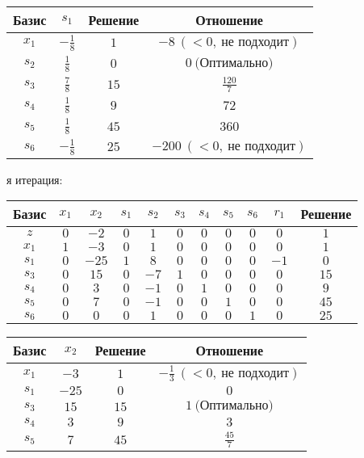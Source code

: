 \documentclass{article}%
\begin{document}
\begin{flushleft}
\begin{tabular}{|cccc|}
\hline%
Базис&$s_{1}$&Решение&Отношение\\%
\hline%
$x_{1}$&$-\frac{1}{8}$&$1$&$-8\: (< 0, \: \text{не подходит})$\\%
$s_{2}$&$\frac{1}{8}$&$0$&$0\: \text{(Оптимально)}$\\%
$s_{3}$&$\frac{7}{8}$&$15$&$\frac{120}{7}$\\%
$s_{4}$&$\frac{1}{8}$&$9$&$72$\\%
$s_{5}$&$\frac{1}{8}$&$45$&$360$\\%
$s_{6}$&$-\frac{1}{8}$&$25$&$-200\: (< 0, \: \text{не подходит})$\\%
\hline%
\end{tabular}%
\newline%
\newline%
я итерация: %
\newline%
\newline%
\renewcommand{\arraystretch}{1.3}%
\begin{tabular}{|c|ccccccccc|c|}%
\hline%
Базис&$x_{1}$&$x_{2}$&$s_{1}$&$s_{2}$&$s_{3}$&$s_{4}$&$s_{5}$&$s_{6}$&$r_{1}$&Решение\\%
\hline%
$z$&$0$&$-2$&$0$&$1$&$0$&$0$&$0$&$0$&$0$&$1$\\%
\hline%
$x_{1}$&$1$&$-3$&$0$&$1$&$0$&$0$&$0$&$0$&$0$&$1$\\%
$s_{1}$&$0$&$-25$&$1$&$8$&$0$&$0$&$0$&$0$&$-1$&$0$\\%
$s_{3}$&$0$&$15$&$0$&$-7$&$1$&$0$&$0$&$0$&$0$&$15$\\%
$s_{4}$&$0$&$3$&$0$&$-1$&$0$&$1$&$0$&$0$&$0$&$9$\\%
$s_{5}$&$0$&$7$&$0$&$-1$&$0$&$0$&$1$&$0$&$0$&$45$\\%
$s_{6}$&$0$&$0$&$0$&$1$&$0$&$0$&$0$&$1$&$0$&$25$\\%
\hline%
\end{tabular}%
\newline%
\newline%
\newline%
\begin{tabular}{|cccc|}%
\hline%
Базис&$x_{2}$&Решение&Отношение\\%
\hline%
$x_{1}$&$-3$&$1$&$-\frac{1}{3}\: (< 0, \: \text{не подходит})$\\%
$s_{1}$&$-25$&$0$&$0$\\%
$s_{3}$&$15$&$15$&$1\: \text{(Оптимально)}$\\%
$s_{4}$&$3$&$9$&$3$\\%
$s_{5}$&$7$&$45$&$\frac{45}{7}$\\%

\end{tabular}
\end{flushleft}
\end{document}

